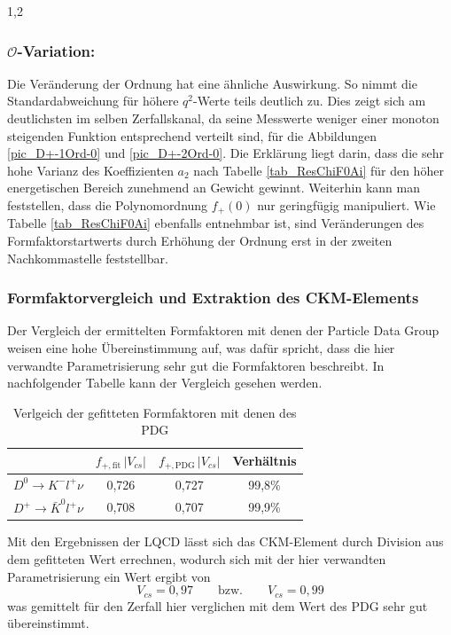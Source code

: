 \documentclass[11pt,a4paper,twoside]{report}
\begin{document}
\begin{spacing}{1,2}
\subsubsection*{$\mathcal{O}$-Variation:}
Die Veränderung der Ordnung hat eine ähnliche Auswirkung. So nimmt die Standardabweichung für höhere $q^2$-Werte teils deutlich zu. Dies zeigt sich 
am deutlichsten im selben Zerfallskanal, da seine Messwerte weniger einer monoton steigenden Funktion entsprechend verteilt sind, für die 
Abbildungen \ref{pic_D+-1Ord-0} und \ref{pic_D+-2Ord-0}. Die Erklärung liegt darin, dass die sehr hohe Varianz des Koeffizienten $a_2$ nach Tabelle
\ref{tab_ResChiF0Ai} für den höher energetischen Bereich zunehmend an Gewicht gewinnt. Weiterhin kann man feststellen, dass die Polynomordnung 
$f_+(0)$ nur geringfügig manipuliert. Wie Tabelle \ref{tab_ResChiF0Ai} ebenfalls entnehmbar ist, sind Veränderungen des Formfaktorstartwerts durch 
Erhöhung der Ordnung erst in der zweiten Nachkommastelle feststellbar.

\subsubsection*{Formfaktorvergleich und Extraktion des CKM-Elements}
Der Vergleich der ermittelten Formfaktoren mit denen der Particle Data Group \cite{PDG} weisen eine hohe Übereinstimmung auf, was dafür spricht, 
dass die hier verwandte Parametrisierung sehr gut die Formfaktoren beschreibt. In nachfolgender Tabelle kann der Vergleich gesehen werden.
\begin{table}[h]
 \begin{tabular}{c|ccc}
 \toprule
  & $f_{+,\text{fit}}\,|V_{cs}|$ & $f_{+,\text{PDG}}\,|V_{cs}|$ & Verhältnis\\
  \midrule
  $D^0 \rightarrow K^- l^+ \nu$ & 0,726 & 0,727 & 99,8\% \\
  $D^+ \rightarrow \bar K^0 l^+ \nu$ & 0,708 & 0,707 & 99,9\% \\
  \bottomrule\bottomrule
 \end{tabular}
\caption{Verlgeich der gefitteten Formfaktoren mit denen des PDG}
\end{table}

\noindent
Mit den Ergebnissen der LQCD \cite{PhysRev_Data} lässt sich das CKM-Element durch Division aus dem gefitteten Wert errechnen, wodurch sich mit der hier
verwandten Parametrisierung ein Wert ergibt von
\begin{equation}
 V_{cs} = 0,97 \qquad \text{bzw.} \qquad V_{cs} = 0,99
\end{equation}
was gemittelt für den Zerfall hier verglichen mit dem Wert des PDG sehr gut übereinstimmt.



\end{spacing}
\end{document}
